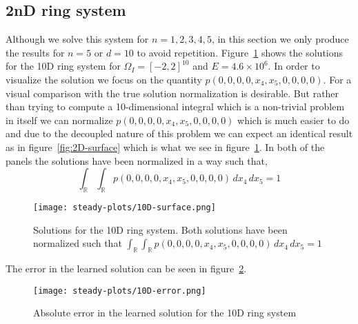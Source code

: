 \subsection{2nD ring system}
Although we solve this system for $n=1,2,3,4,5$, in this section we only produce the results for $n=5$ or $d=10$ to avoid repetition. Figure~\ref{fig:10D-surface} shows the solutions for  the 10D ring system for $\Omega_I=[-2, 2]^{10}$ and $E=4.6\times10^6$. In order to visualize the solution we focus on the quantity
$
    p(0, 0, 0, 0, x_4, x_5, 0, 0, 0, 0)
$.
For a visual comparison with the true solution normalization is desirable. But rather than trying to compute a 10-dimensional integral which is a non-trivial problem in itself we can normalize $
    p(0, 0, 0, 0, x_4, x_5, 0, 0, 0, 0)
$ which is much easier to do and due to the decoupled nature of this problem we can expect an identical result as in figure~\ref{fig:2D-surface} which is what we see in figure~\ref{fig:10D-surface}. In both of the panels the solutions have been normalized in a way such that,
$$\int_{\mathbb R}\int_{\mathbb R}p(0, 0, 0, 0, x_4, x_5, 0, 0, 0, 0)\,dx_4\,dx_5=1$$

\begin{figure}[!ht]
    \centering\texttt{[image: steady-plots/10D-surface.png]}
\caption{Solutions for the 10D ring system. Both solutions have been normalized such that $\int_{\mathbb R}\int_{\mathbb R}p(0, 0, 0, 0, x_4, x_5, 0, 0, 0, 0)\,dx_4\,dx_5=1$} 
    \label{fig:10D-surface}
\end{figure}
The error in the learned solution can be seen in figure~\ref{fig:10D-error}.

\begin{figure}[!ht]
    \centering
\texttt{[image: steady-plots/10D-error.png]}
\caption{Absolute error in the learned solution for the 10D ring system}
    \label{fig:10D-error}
\end{figure}

    

